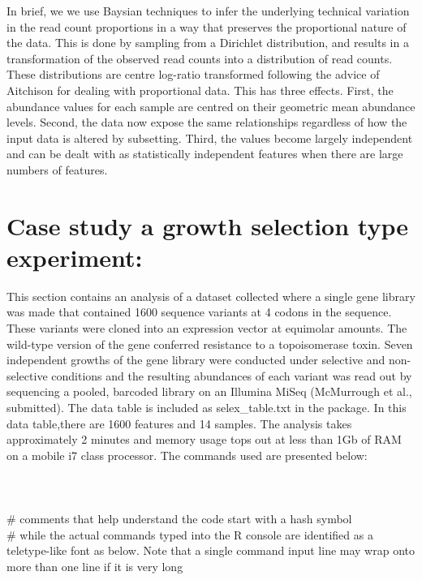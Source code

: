 \documentclass[11pt]{amsart}
\begin{document}
In brief, we we use Baysian techniques to infer the underlying technical variation in the read count proportions in a way that preserves the proportional nature of the data. This is done by sampling from a Dirichlet distribution, and results in a transformation of the observed read counts into a distribution of read counts. These distributions are centre log-ratio transformed following the advice of Aitchison\cite{Aitchison:1986} for dealing with proportional data. This has three effects. First, the abundance values for each sample are centred on their geometric mean abundance levels. Second, the data now expose the same relationships regardless of how the input data is altered by subsetting. Third, the values become largely independent and can be dealt with as statistically independent features when there are large numbers of features.  

\section{Case study a growth selection type experiment:}{\label{example}} This section contains an analysis of a dataset collected where a single gene  library was made that contained 1600 sequence variants at 4 codons in the sequence. These variants were cloned into an expression vector at equimolar amounts. The wild-type version of the gene conferred resistance to a topoisomerase toxin. Seven independent growths of the gene library were conducted under selective and non-selective conditions and the resulting abundances of each variant was read out by sequencing a pooled, barcoded library on an Illumina MiSeq (McMurrough et al., submitted). The data table is included as selex\_table.txt in the package. In this data table,there are 1600 features and 14 samples. The analysis takes approximately 2 minutes and memory usage tops out at less than 1Gb of RAM on a mobile i7 class processor.  The commands used are presented below:\\\\
\\\\
\noindent \#  comments that help understand the code start with a hash symbol\\

\noindent \# while the actual commands typed into the R console are identified as a teletype-like font as below. Note that a single command input line may wrap onto more than one line if it is very long\\
\end{document}
